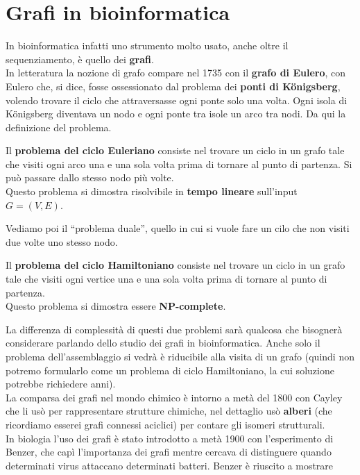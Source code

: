 \documentclass[a4paper,12pt, oneside]{book}
\begin{document}
\section{Grafi in bioinformatica}
In bioinformatica infatti uno strumento molto usato, anche oltre il
sequenziamento, è quello dei \textbf{grafi}.\\
In letteratura la nozione di grafo compare nel 1735 con il \textbf{grafo di
  Eulero}, con Eulero che, si dice, fosse ossessionato dal problema dei
\textbf{ponti di K\"{o}nigsberg}, volendo trovare il ciclo che attraversasse
ogni ponte solo una volta. Ogni isola di K\"{o}nigsberg diventava un nodo e ogni
ponte tra isole un arco tra nodi. Da qui la definizione del problema.
\begin{definizione}
  Il  \textbf{problema del ciclo Euleriano} consiste nel trovare un ciclo in un
  grafo tale che visiti ogni arco una e una sola volta prima di tornare al punto
  di partenza. Si può passare dallo stesso nodo più volte.\\
  Questo problema si dimostra risolvibile in \textbf{tempo lineare} sull'input
  $G=(V,E)$. 
\end{definizione}
Vediamo poi il ``problema duale'', quello in cui si vuole fare un cilo che non
visiti due volte uno stesso nodo.
\begin{definizione}
  Il  \textbf{problema del ciclo Hamiltoniano} consiste nel trovare un ciclo in
  un grafo tale che visiti ogni vertice una e una sola volta prima di tornare al
  punto di partenza.\\
  Questo problema si dimostra essere \textbf{NP-complete}.
\end{definizione}
La differenza di complessità di questi due problemi sarà qualcosa che bisognerà
considerare parlando dello studio dei grafi in bioinformatica. Anche solo il
problema dell'assemblaggio si vedrà è riducibile alla visita di un grafo (quindi
non potremo formularlo come un problema di ciclo Hamiltoniano, la cui soluzione
potrebbe richiedere anni).\\
La comparsa dei grafi nel mondo chimico è intorno a metà del 1800 con Cayley che
li usò per rappresentare strutture chimiche, nel dettaglio usò \textbf{alberi}
(che ricordiamo esserei grafi connessi aciclici) per contare gli isomeri
strutturali.\\
In biologia l'uso dei grafi è stato introdotto a metà 1900 con l'esperimento di
Benzer, che capì l'importanza dei grafi mentre cercava di distinguere quando
determinati virus attaccano determinati batteri. Benzer è riuscito a mostrare
\end{document}
